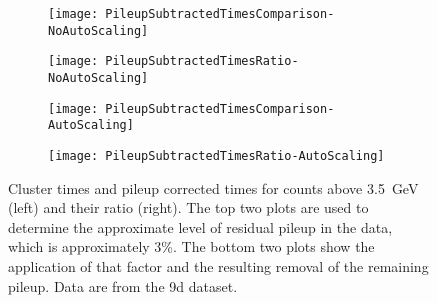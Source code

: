 \begin{landscape}
    \begin{figure}
    \centering
        \begin{subfigure}[]{0.6\textwidth}
            \centering
            \texttt{[image: PileupSubtractedTimesComparison-NoAutoScaling]}
        \end{subfigure}%
        \hspace{1cm}
        \begin{subfigure}[]{0.6\textwidth}
            \centering
            \texttt{[image: PileupSubtractedTimesRatio-NoAutoScaling]}
        \end{subfigure}

        \begin{subfigure}[]{0.6\textwidth}
            \centering
            \texttt{[image: PileupSubtractedTimesComparison-AutoScaling]}
        \end{subfigure}%
        \hspace{1cm}
        \begin{subfigure}[]{0.6\textwidth}
            \centering
            \texttt{[image: PileupSubtractedTimesRatio-AutoScaling]}
        \end{subfigure}
    \caption[Cluster times above \SI{3.5}{\GeV}]{Cluster times and pileup corrected times for counts above \SI{3.5}{\GeV} (left) and their ratio (right). The top two plots are used to determine the approximate level of residual pileup in the data, which is approximately 3\%. The bottom two plots show the application of that factor and the resulting removal of the remaining pileup. Data are from the 9d dataset.}
    \label{fig:PileupTimesRatio}
    \end{figure}
\end{landscape}


